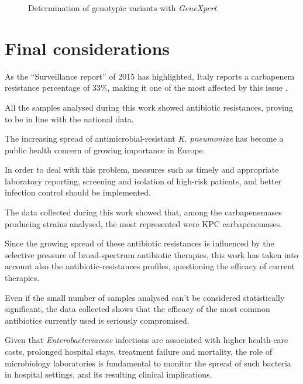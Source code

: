 \documentclass[11pt]{report}
\begin{document}
\begin{figure}[h!]
\centering

\caption{Determination of genotypic variants with \emph{GeneXpert}}
\label{genexpert}
\end{figure}

\chapter{Final considerations}

As the ``Surveillance report'' of 2015 has highlighted, Italy reports a carbapenem resistance percentage of 33$\%$, making it one of the most affected by this issue \cite{ECDC_Surveillance}.

All the samples analysed during this work showed antibiotic resistances, proving to be in line with the national data.

The increasing spread of antimicrobial-resistant \emph{K. pneumoniae} has become a public health concern of growing importance in Europe.

In order to deal with this problem, measures such as timely and appropriate laboratory reporting, screening and isolation of high-risk patients, and better infection control should be implemented.

The data collected during this work showed that, among the carbapenemases producing strains analysed, the most represented were KPC carbapenemases.

Since the growing spread of these antibiotic resistances is influenced by the selective pressure of broad-spectrum antibiotic therapies, this work has taken into account also the antibiotic-resistances profiles, questioning the efficacy of current therapies.
 
Even if the small number of samples analysed can't be considered statistically significant, the data collected shows that the efficacy of the most common antibiotics currently used is seriously compromised.

Given that \emph{Enterobacteriaceae} infections are associated with higher health-care costs, prolonged hospital stays, treatment failure and mortality, the role of microbiology laboratories is fundamental to monitor the spread of such bacteria in hospital settings, and its resulting clinical implications.







\end{document}
